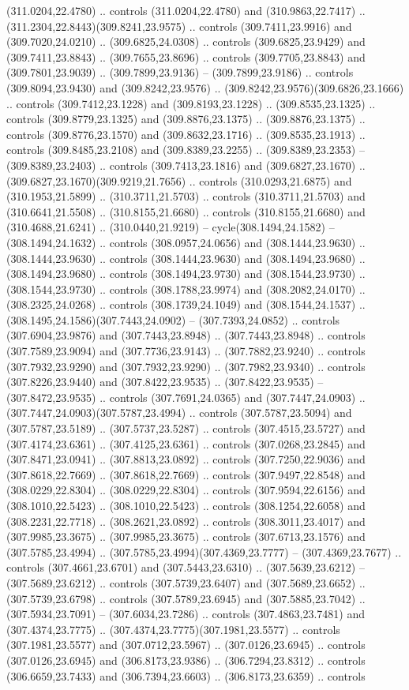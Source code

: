 (311.0204,22.4780) .. controls (311.0204,22.4780) and (310.9863,22.7417) .. (311.2304,22.8443)(309.8241,23.9575) .. controls (309.7411,23.9916) and (309.7020,24.0210) .. (309.6825,24.0308) .. controls (309.6825,23.9429) and (309.7411,23.8843) .. (309.7655,23.8696) .. controls (309.7705,23.8843) and (309.7801,23.9039) .. (309.7899,23.9136) -- (309.7899,23.9186) .. controls (309.8094,23.9430) and (309.8242,23.9576) .. (309.8242,23.9576)(309.6826,23.1666) .. controls (309.7412,23.1228) and (309.8193,23.1228) .. (309.8535,23.1325) .. controls (309.8779,23.1325) and (309.8876,23.1375) .. (309.8876,23.1375) .. controls (309.8776,23.1570) and (309.8632,23.1716) .. (309.8535,23.1913) .. controls (309.8485,23.2108) and (309.8389,23.2255) .. (309.8389,23.2353) -- (309.8389,23.2403) .. controls (309.7413,23.1816) and (309.6827,23.1670) .. (309.6827,23.1670)(309.9219,21.7656) .. controls (310.0293,21.6875) and (310.1953,21.5899) .. (310.3711,21.5703) .. controls (310.3711,21.5703) and (310.6641,21.5508) .. (310.8155,21.6680) .. controls (310.8155,21.6680) and (310.4688,21.6241) .. (310.0440,21.9219) -- cycle(308.1494,24.1582) -- (308.1494,24.1632) .. controls (308.0957,24.0656) and (308.1444,23.9630) .. (308.1444,23.9630) .. controls (308.1444,23.9630) and (308.1494,23.9680) .. (308.1494,23.9680) .. controls (308.1494,23.9730) and (308.1544,23.9730) .. (308.1544,23.9730) .. controls (308.1788,23.9974) and (308.2082,24.0170) .. (308.2325,24.0268) .. controls (308.1739,24.1049) and (308.1544,24.1537) .. (308.1495,24.1586)(307.7443,24.0902) -- (307.7393,24.0852) .. controls (307.6904,23.9876) and (307.7443,23.8948) .. (307.7443,23.8948) .. controls (307.7589,23.9094) and (307.7736,23.9143) .. (307.7882,23.9240) .. controls (307.7932,23.9290) and (307.7932,23.9290) .. (307.7982,23.9340) .. controls (307.8226,23.9440) and (307.8422,23.9535) .. (307.8422,23.9535) -- (307.8472,23.9535) .. controls (307.7691,24.0365) and (307.7447,24.0903) .. (307.7447,24.0903)(307.5787,23.4994) .. controls (307.5787,23.5094) and (307.5787,23.5189) .. (307.5737,23.5287) .. controls (307.4515,23.5727) and (307.4174,23.6361) .. (307.4125,23.6361) .. controls (307.0268,23.2845) and (307.8471,23.0941) .. (307.8813,23.0892) .. controls (307.7250,22.9036) and (307.8618,22.7669) .. (307.8618,22.7669) .. controls (307.9497,22.8548) and (308.0229,22.8304) .. (308.0229,22.8304) .. controls (307.9594,22.6156) and (308.1010,22.5423) .. (308.1010,22.5423) .. controls (308.1254,22.6058) and (308.2231,22.7718) .. (308.2621,23.0892) .. controls (308.3011,23.4017) and (307.9985,23.3675) .. (307.9985,23.3675) .. controls (307.6713,23.1576) and (307.5785,23.4994) .. (307.5785,23.4994)(307.4369,23.7777) -- (307.4369,23.7677) .. controls (307.4661,23.6701) and (307.5443,23.6310) .. (307.5639,23.6212) -- (307.5689,23.6212) .. controls (307.5739,23.6407) and (307.5689,23.6652) .. (307.5739,23.6798) .. controls (307.5789,23.6945) and (307.5885,23.7042) .. (307.5934,23.7091) -- (307.6034,23.7286) .. controls (307.4863,23.7481) and (307.4374,23.7775) .. (307.4374,23.7775)(307.1981,23.5577) .. controls (307.1981,23.5577) and (307.0712,23.5967) .. (307.0126,23.6945) .. controls (307.0126,23.6945) and (306.8173,23.9386) .. (306.7294,23.8312) .. controls (306.6659,23.7433) and (306.7394,23.6603) .. (306.8173,23.6359) .. controls 